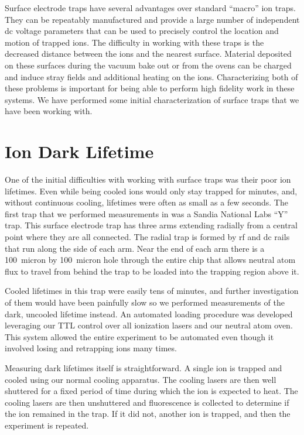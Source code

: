 
\graphicspath{ {\curdir/Graphics/}  }

Surface electrode traps have several advantages over standard ``macro'' ion traps.  They can be repeatably manufactured and provide a large number of independent dc voltage parameters that can be used to precisely control the location and motion of trapped ions.  The difficulty in working with these traps is the decreased distance between the ions and the nearest surface.  Material deposited on these surfaces during the vacuum bake out or from the ovens can be charged and induce stray fields and additional heating on the ions.  Characterizing both of these problems is important for being able to perform high fidelity work in these systems.  We have performed some initial characterization of surface traps that we have been working with.  

\section{Ion Dark Lifetime}
\label{sec:lifetime}

One of the initial difficulties with working with surface traps was their poor ion lifetimes.  Even while being cooled ions would only stay trapped for minutes, and, without continuous cooling, lifetimes were often as small as a few seconds.  The first trap that we performed measurements in was a Sandia National Labs ``Y'' trap.  This surface electrode trap has three arms extending radially from a central point where they are all connected.  The radial trap is formed by rf and dc rails that run along the side of each arm.  Near the end of each arm there is a 100~micron by 100~micron hole through the entire chip that allows neutral atom flux to travel from behind the trap to be loaded into the trapping region above it.

Cooled lifetimes in this trap were easily tens of minutes, and further investigation of them would have been painfully slow so we performed measurements of the dark, uncooled lifetime instead.  An automated loading procedure was developed leveraging our TTL control over all ionization lasers and our neutral atom oven.  This system allowed the entire experiment to be automated even though it involved losing and retrapping ions many times.

Measuring dark lifetimes itself is straightforward.  A single ion is trapped and cooled using our normal cooling apparatus.  The cooling lasers are then well shuttered for a fixed period of time during which the ion is expected to heat.  The cooling lasers are then unshuttered and fluorescence is collected to determine if the ion remained in the trap.  If it did not, another ion is trapped, and then the experiment is repeated.

